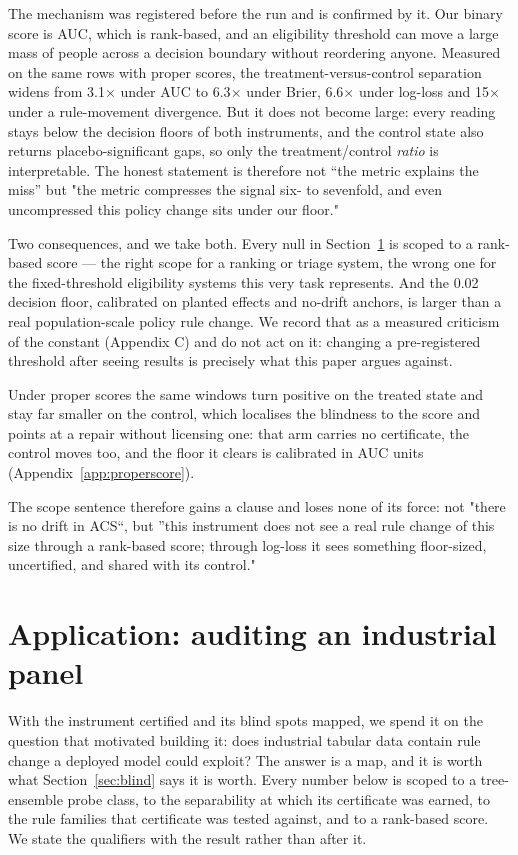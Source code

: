 \documentclass[10pt]{article} %
\begin{document}
The mechanism was registered before the run and is confirmed by it. Our binary score is AUC, which
is rank-based, and an eligibility threshold can move a large mass of people across a decision
boundary without reordering anyone. Measured on the same rows with proper scores, the
treatment-versus-control separation widens from 3.1$\times$ under AUC to 6.3$\times$ under Brier, 6.6$\times$ under
log-loss and 15$\times$ under a rule-movement divergence. But it does not become large: every reading
stays below the decision floors of both instruments, and the control state also returns
placebo-significant gaps, so only the treatment/control \emph{ratio} is interpretable. The honest
statement is therefore not ``the metric explains the miss'' but "the metric compresses the signal
six- to sevenfold, and even uncompressed this policy change sits under our floor."

Two consequences, and we take both. Every null in Section~\ref{sec:application} is scoped to a rank-based score --- the right
scope for a ranking or triage system, the wrong one for the fixed-threshold eligibility systems
this very task represents. And the 0.02 decision floor, calibrated on planted effects and no-drift
anchors, is larger than a real population-scale policy rule change. We record that as a
measured criticism of the constant (Appendix C) and do not act on it: changing a pre-registered
threshold after seeing results is precisely what this paper argues against.

Under proper scores the same windows turn positive on the treated state and stay far
smaller on the control, which localises the blindness to the score and points at a repair without
licensing one: that arm carries no certificate, the control moves too, and the floor it clears is
calibrated in AUC units (Appendix~\ref{app:properscore}).

The scope sentence therefore gains a clause and loses none of its force: not "there is no drift in
ACS``, but ''this instrument does not see a real rule change of this size through a rank-based
score; through log-loss it sees something floor-sized, uncertified, and shared with its control."

\section{Application: auditing an industrial panel}\label{sec:application}

With the instrument certified and its blind spots mapped, we spend it on the question that
motivated building it: does industrial tabular data contain rule change a deployed model could
exploit? The answer is a map, and it is worth what Section~\ref{sec:blind} says it is worth. Every
number below is scoped to a tree-ensemble probe class, to the separability at which its
certificate was earned, to the rule families that certificate was tested against, and to a
rank-based score. We state the qualifiers with the result rather than after it.
\end{document}
